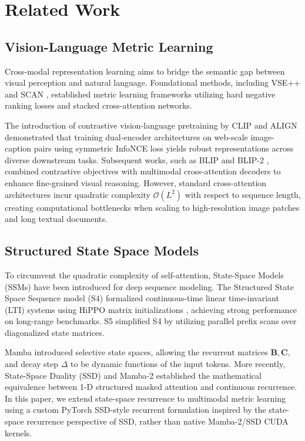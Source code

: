 \documentclass[pdflatex,sn-mathphys-num]{sn-jnl}%
\begin{document}
\section{Related Work}
\label{sec:related_work}

\subsection{Vision-Language Metric Learning}
Cross-modal representation learning aims to bridge the semantic gap between visual perception and natural language. Foundational methods, including VSE++ \cite{faghri2017vse++} and SCAN \cite{lee2018stacked}, established metric learning frameworks utilizing hard negative ranking losses and stacked cross-attention networks. 

The introduction of contrastive vision-language pretraining by CLIP \cite{radford2021learning} and ALIGN \cite{jia2021scaling} demonstrated that training dual-encoder architectures on web-scale image-caption pairs using symmetric InfoNCE loss yields robust representations across diverse downstream tasks. Subsequent works, such as BLIP \cite{li2022blip} and BLIP-2 \cite{li2023blip2}, combined contrastive objectives with multimodal cross-attention decoders to enhance fine-grained visual reasoning. However, standard cross-attention architectures incur quadratic complexity $\mathcal{O}(L^2)$ with respect to sequence length, creating computational bottlenecks when scaling to high-resolution image patches and long textual documents.

\subsection{Structured State Space Models}
To circumvent the quadratic complexity of self-attention, State-Space Models (SSMs) have been introduced for deep sequence modeling. The Structured State Space Sequence model (S4) \cite{gu2021efficiently} formalized continuous-time linear time-invariant (LTI) systems using HiPPO matrix initializations \cite{gu2020hippo}, achieving strong performance on long-range benchmarks. S5 \cite{smith2022simplified} simplified S4 by utilizing parallel prefix scans over diagonalized state matrices.

Mamba \cite{gu2023mamba} introduced selective state spaces, allowing the recurrent matrices $\mathbf{B}, \mathbf{C},$ and decay step $\Delta$ to be dynamic functions of the input tokens. More recently, State-Space Duality (SSD) and Mamba-2 \cite{dao2024transformers} established the mathematical equivalence between 1-D structured masked attention and continuous recurrence. In this paper, we extend state-space recurrence to multimodal metric learning using a custom PyTorch SSD-style recurrent formulation inspired by the state-space recurrence perspective of SSD, rather than native Mamba-2/SSD CUDA kernels.
\end{document}
